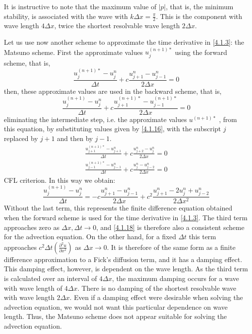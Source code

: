 It is instructive to note that the maximum value of $|p|$, that is, the minimum stability, is associated with the wave with $k\Delta x=\frac{\pi}{2}$. This is the component with wave length $4\Delta x$, twice the shortest resolvable wave length $2\Delta x$.


Let us use now another scheme to approximate the time derivative in \ref{4.1.3}: the Matsuno scheme. First the approximate values $u_j^{(n+1)*}$ using the forward scheme, that is,
\begin{equation}\label{4.1.16}
    \frac{u_j^{(n+1)*}-u_j^n}{\Delta t}+c\frac{u^n_{j+1}-u^n_{j-1}}{2\Delta x}=0
\end{equation}
then, these approximate values are used in the backward scheme, that is, 
\begin{equation}\label{4.1.17}
    \frac{u_j^{(n+1)}-u_j^n}{\Delta t}+c\frac{u_{j+1}^{(n+1)*}-u_{j-1}^{(n+1)*}}{2\Delta x}=0
\end{equation}
eliminating the intermediate step, i.e. the approximate values $u^{(n+1)*}$ , from this equation, by substituting values given by \ref{4.1.16}, with the subscript $j$ replaced by $j+1$ and then by $j-1$.
\begin{align*}
    \frac{u_{j+1}^{(n+1)*}-u_{j+1}^n}{\Delta t}+c\frac{u_{j+2}^{n}-u_{j}^{n}}{2\Delta x}=0 \\
    \frac{u_{j-1}^{(n+1)*}-u_{j-1}^n}{\Delta t}+c\frac{u_j^{n}-u_{j-2}^{n}}{2\Delta x}=0
\end{align*}
CFL criterion.
In this way we obtain:
\begin{equation}\label{4.1.18}
    \frac{u_j^{(n+1)}-u_j^n}{\Delta t}=-c\frac{u_{j+1}^{n}-u_{j-1}^{n}}{2\Delta x}+c^2\frac{u^n_{j+1}-2u^n_j+u^n_{j-2}}{2\Delta x^2}
\end{equation}
Without the last term, this represents the finite difference equation obtained when the forward scheme is used for the time derivative in \ref{4.1.3}. The third term approaches zero as $\Delta x,\Delta t\rightarrow 0$, and \ref{4.1.18} is therefore also a consistent scheme for the advection equation. On the other hand, for a fixed $\Delta t$ this term approaches $c^2\Delta t\left(\frac{\partial^2u}{\partial x^2}\right)$ as $\Delta x\rightarrow0$. It is therefore of the same form as a finite difference approximation to a Fick’s diffusion term, and it has a damping effect. This damping effect, however, is dependent on the wave length. As the third term is calculated over an interval of $4\Delta x$, the maximum damping occurs for a wave with wave length of $4\Delta x$. There is no damping of the shortest resolvable wave with wave length $2\Delta x$. Even if a damping effect were desirable when solving the advection equation, we would not want this particular dependence on wave length. Thus, the Matsuno scheme does not appear suitable for solving the advection equation.

